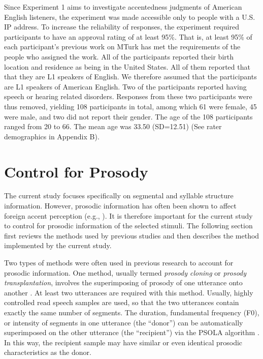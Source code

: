 Since Experiment 1 aims to investigate accentedness judgments of American English listeners, the experiment was made accessible only to people with a U.S. IP address. To increase the reliability of responses, the experiment required participants to have an approval rating of at least 95\%. That is, at least 95\% of each participant’s previous work on MTurk has met the requirements of the people who assigned the work.  All of the participants reported their birth location and residence as being in the United States. All of them reported that that they are L1 speakers of English. We therefore assumed that the participants are L1 speakers of American English. Two of the participants reported having speech or hearing related disorders. Responses from these two participants were thus removed, yielding 108 participants in total, among which 61 were female, 45 were male, and two did not report their gender. The age of the 108 participants ranged from 20 to 66. The mean age was 33.50 (SD=12.51) (See rater demographics in Appendix B).

\section{Control for Prosody}
\label{ch4:prosody}

The current study focuses specifically on segmental and syllable structure information. However, prosodic information has often been shown to affect foreign accent perception (e.g., \citealp{Magen_1998, Munro_1995}). It is therefore important for the current study to control for prosodic information of the selected stimuli. The following section first reviews the methods used by previous studies and then describes the method implemented by the current study.

 Two types of methods were often used in previous research to account for prosodic information. One method, usually termed \textit{prosody cloning} or \textit{prosody transplantation}, involves the superimposing of prosody of one utterance onto another \citep{Mareuil_2006, Yoon_2007}. At least two utterances are required with this method. Usually, highly controlled read speech samples are used, so that the two utterances contain exactly the same number of segments. The duration, fundamental frequency (F0), or intensity of segments in one utterance (the “donor”) can be automatically superimposed on the other utterance (the “recipient”) via the PSOLA algorithm \citep{Moulines_1990}. In this way, the recipient sample may have similar or even identical prosodic characteristics as the donor. 

